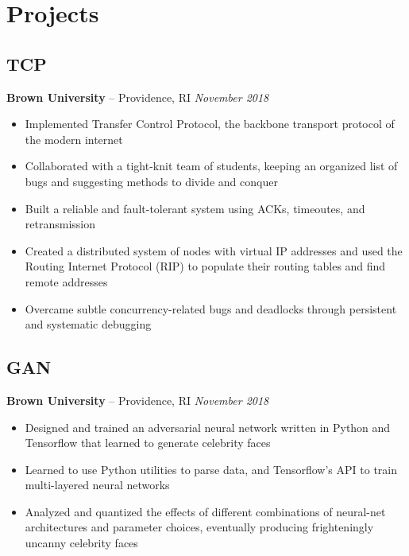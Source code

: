 \documentclass[11pt]{article}
\begin{document}
\section{Projects}
\subsection{TCP}
\textbf{Brown University} -- Providence, RI \hfill \textit{November 2018}
\begin{itemize}
	\item Implemented Transfer Control Protocol, the backbone transport protocol of the modern internet 
	\item Collaborated with a tight-knit team of students, keeping an organized list of bugs and suggesting methods to divide and conquer
	\item Built a reliable and fault-tolerant system using ACKs, timeoutes, and retransmission
	\item Created a distributed system of nodes with virtual IP addresses and used the Routing Internet Protocol (RIP) to populate their routing tables and find remote addresses
	\item Overcame subtle concurrency-related bugs and deadlocks through persistent and systematic debugging 
\end{itemize}

\subsection{GAN} 
\textbf{Brown University} -- Providence, RI \hfill \textit{November 2018}
\begin{itemize}
	\item Designed and trained an adversarial neural network written in Python and Tensorflow that learned to generate celebrity faces
	\item Learned to use Python utilities to parse data, and Tensorflow's API to train multi-layered neural networks
	\item Analyzed and quantized the effects of different combinations of neural-net architectures and parameter choices, eventually producing frighteningly uncanny celebrity faces
\end{itemize}
\end{document}
